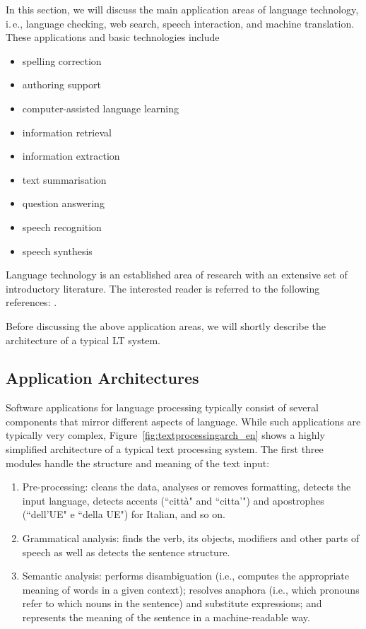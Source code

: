 \documentclass[]{../../metanetpaper}
\begin{document}
\begin{multicols}{2}
In this section, we will discuss the main application areas of language
technology, i.\,e., language checking, web search, speech interaction, and
machine translation. These applications and basic technologies include 


\begin{itemize}
\item spelling correction
\item authoring support
\item computer-assisted language learning
\item information retrieval 
\item information extraction
\item text summarisation
\item question answering
\item speech recognition 
\item speech synthesis 
\end{itemize}


Language technology is an established area of research with an extensive set
of introductory literature. The interested reader is referred to the following
references:  \cite{carstensen-etal1, jurafsky-martin01, manning-schuetze1,
  lt-world1, lt-survey1}.


Before discussing the above application areas, we will shortly describe the
architecture of a typical LT system.



\subsection{Application Architectures}

Software applications for language processing typically consist of several
components that mirror different aspects of language. While such applications
are typically very complex, Figure~\ref{fig:textprocessingarch_en} shows a 
highly simplified architecture of a typical text processing system. The first 
three modules handle the structure and meaning of the text input:

\begin{enumerate}
\item Pre-processing: cleans the data, analyses or removes formatting, detects
  the input language, detects accents (“citt\`{a}" and “citta'") and apostrophes (“dell'UE" e “della UE") for Italian, and so on.
\item Grammatical analysis: finds the verb, its objects, modifiers and other parts of speech as well as detects the sentence structure.
\item Semantic analysis: performs disambiguation (i.e., computes the appropriate meaning of words in a given context); resolves anaphora (i.e., which pronouns refer to which nouns in the sentence) and substitute expressions; and represents the meaning of the sentence in a machine-readable way.
\end{enumerate}


\end{multicols}
\end{document}
